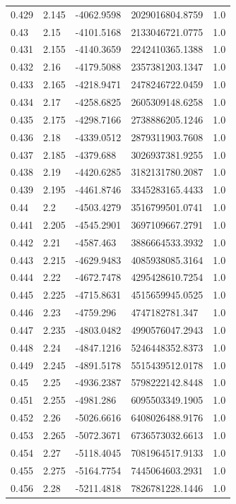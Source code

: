 \begin{tabular}{lllll}
0.429 & 2.145 & -4062.9598 & 2029016804.8759 & 1.0 \\
0.43 & 2.15 & -4101.5168 & 2133046721.0775 & 1.0 \\
0.431 & 2.155 & -4140.3659 & 2242410365.1388 & 1.0 \\
0.432 & 2.16 & -4179.5088 & 2357381203.1347 & 1.0 \\
0.433 & 2.165 & -4218.9471 & 2478246722.0459 & 1.0 \\
0.434 & 2.17 & -4258.6825 & 2605309148.6258 & 1.0 \\
0.435 & 2.175 & -4298.7166 & 2738886205.1246 & 1.0 \\
0.436 & 2.18 & -4339.0512 & 2879311903.7608 & 1.0 \\
0.437 & 2.185 & -4379.688 & 3026937381.9255 & 1.0 \\
0.438 & 2.19 & -4420.6285 & 3182131780.2087 & 1.0 \\
0.439 & 2.195 & -4461.8746 & 3345283165.4433 & 1.0 \\
0.44 & 2.2 & -4503.4279 & 3516799501.0741 & 1.0 \\
0.441 & 2.205 & -4545.2901 & 3697109667.2791 & 1.0 \\
0.442 & 2.21 & -4587.463 & 3886664533.3932 & 1.0 \\
0.443 & 2.215 & -4629.9483 & 4085938085.3164 & 1.0 \\
0.444 & 2.22 & -4672.7478 & 4295428610.7254 & 1.0 \\
0.445 & 2.225 & -4715.8631 & 4515659945.0525 & 1.0 \\
0.446 & 2.23 & -4759.296 & 4747182781.347 & 1.0 \\
0.447 & 2.235 & -4803.0482 & 4990576047.2943 & 1.0 \\
0.448 & 2.24 & -4847.1216 & 5246448352.8373 & 1.0 \\
0.449 & 2.245 & -4891.5178 & 5515439512.0178 & 1.0 \\
0.45 & 2.25 & -4936.2387 & 5798222142.8448 & 1.0 \\
0.451 & 2.255 & -4981.286 & 6095503349.1905 & 1.0 \\
0.452 & 2.26 & -5026.6616 & 6408026488.9176 & 1.0 \\
0.453 & 2.265 & -5072.3671 & 6736573032.6613 & 1.0 \\
0.454 & 2.27 & -5118.4045 & 7081964517.9133 & 1.0 \\
0.455 & 2.275 & -5164.7754 & 7445064603.2931 & 1.0 \\
0.456 & 2.28 & -5211.4818 & 7826781228.1446 & 1.0 \\

\end{tabular}
